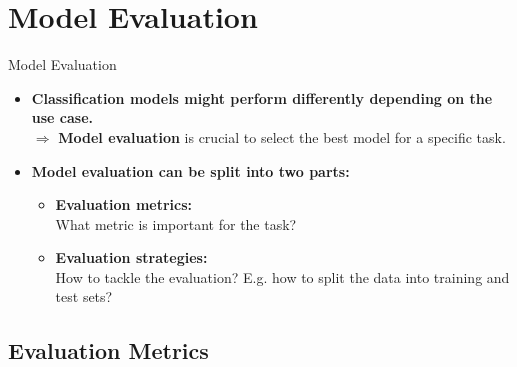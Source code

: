 \section{Model Evaluation}\label{section:evaluation}

\begin{frame}{Model Evaluation}
	\begin{itemize}
		\item \textbf{Classification models might perform differently depending on the use case.} \\
		      $\Rightarrow$ \textbf{\color{airforceblue}Model evaluation} is crucial to select the best model for a specific task.
		\item \textbf{Model evaluation can be split into two parts:}
		      \begin{itemize}
			      \item \textbf{\color{airforceblue}Evaluation metrics:} \\
			            What metric is important for the task?

			      \item \textbf{\color{airforceblue}Evaluation strategies:} \\
			            How to tackle the evaluation? E.g. how to split the data into training and test sets?
		      \end{itemize}
	\end{itemize}
\end{frame}

\subsection{Evaluation Metrics}

